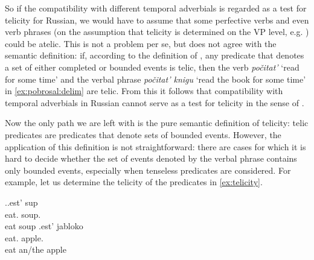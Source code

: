 So if the compatibility with different temporal adverbials is regarded as a test for telicity for Russian, we would have to assume that some perfective verbs  and even verb phrases (on the assumption that telicity is determined on the VP level, e.g. \citealt{Borer:05}) could be atelic. This is not a problem per se, but does not agree with the semantic definition: if, according to the definition of \citet[3]{Rothstein:08a}, any predicate that denotes a set of either completed or bounded events is telic, then the verb \textit{po\v{c}itat'} `read for some time' and the verbal phrase \textit{po\v{c}itat' knigu} `read the book for some time' in \ref{ex:pobrosal:delim} are telic. From this it follows that compatibility with temporal adverbials in Russian cannot serve as a test for telicity in the sense of \citet{Rothstein:08a}.




Now the only path we are left with is the pure semantic definition of telicity: telic predicates are predicates that denote sets of bounded events. However, the application of this definition is not straightforward: there are cases for which it is hard to decide whether the set of events denoted by the verbal phrase contains only bounded events, especially when tenseless predicates are considered. For example, let us determine the telicity of the predicates in \ref{ex:telicity}.

\ex.\label{ex:telicity}\ag.\label{ex:telicity:soup}est' sup\\
eat. soup.\\
eat soup
\bg.\label{ex:telicity:apple}est' jabloko\\
eat. apple.\\
eat an/the apple

